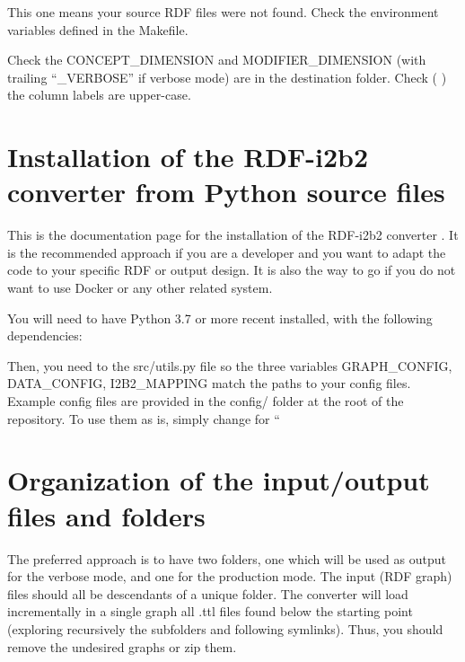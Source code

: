\documentclass[letterpaper,10pt,english]{sphinxmanual}
\begin{document}
This one means your source RDF files were not found. Check the environment variables defined in the Makefile.

\begin{sphinxVerbatim}[commandchars=\\\{\}]
\end{sphinxVerbatim}

Check the CONCEPT\_DIMENSION and MODIFIER\_DIMENSION (with trailing “\_VERBOSE” if verbose mode) are in the destination folder. Check (  )  the column labels are upper-case.


\section{Installation of the RDF-i2b2 converter from Python source files}
\label{\detokenize{installation:installation-of-the-rdf-i2b2-converter-from-python-source-files}}\label{\detokenize{installation:installation}}\label{\detokenize{installation::doc}}
This is the documentation page for the installation of the RDF-i2b2 converter . It is the recommended approach if you are a developer and you want to adapt the code to your specific RDF or output design. It is also the way to go if you do not want to use Docker or any other related system.

You will need to have Python 3.7 or more recent installed, with the following dependencies:

Then, you need to  the src/utils.py file so the three variables GRAPH\_CONFIG, DATA\_CONFIG, I2B2\_MAPPING match the paths to your config files. Example config files are provided in the config/ folder at the root of the repository. To use them as is, simply change  for “


\section{Organization of the input/output files and folders}
\label{\detokenize{structure:organization-of-the-input-output-files-and-folders}}\label{\detokenize{structure:structure}}\label{\detokenize{structure::doc}}
The preferred approach is to have two folders, one which will be used as output for the verbose mode, and one for the production mode.
The input (RDF graph) files should all be descendants of a unique folder. The converter will load incrementally in a single graph all .ttl files found below the starting point (exploring recursively the subfolders and following symlinks). Thus, you should remove the undesired graphs or zip them.
\end{document}
